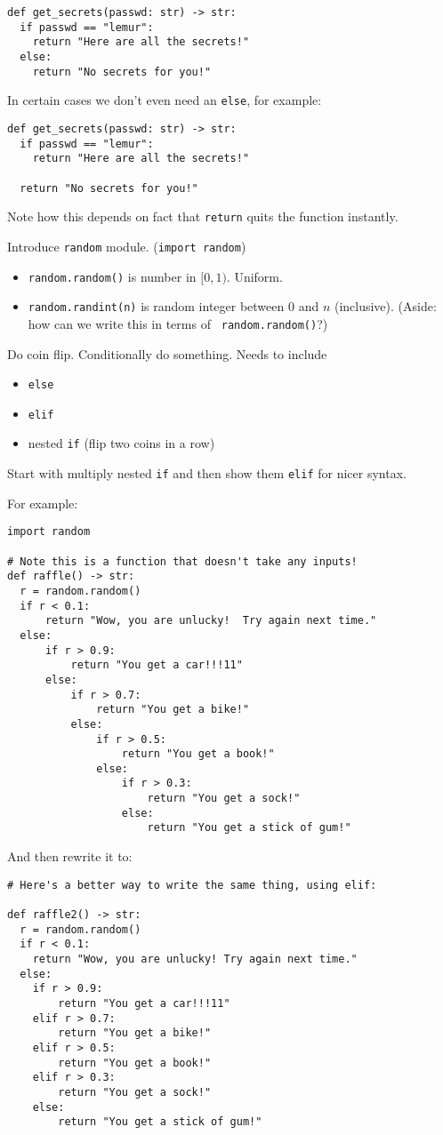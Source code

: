 \documentclass{article}
\begin{document}
\begin{verbatim}
def get_secrets(passwd: str) -> str:
  if passwd == "lemur":
    return "Here are all the secrets!"
  else:
    return "No secrets for you!"
\end{verbatim}

In certain cases we don't even need an \verb|else|, for example:
\begin{verbatim}
def get_secrets(passwd: str) -> str:
  if passwd == "lemur":
    return "Here are all the secrets!"

  return "No secrets for you!"
\end{verbatim}
Note how this depends on fact that \verb|return| quits the function
instantly.

Introduce \verb|random| module. ({\tt import random})
\begin{itemize}
\item {\tt random.random()} is number in $[0,1)$. Uniform.
\item {\tt random.randint(n)} is random integer between $0$ and $n$
  (inclusive).  (Aside: how can we write this in terms of {\tt
    random.random()}?)
\end{itemize}
Do coin flip.  Conditionally do something.  Needs to include
\begin{itemize}
\item {\tt else}
\item {\tt elif}
\item nested {\tt if}  (flip two coins in a row)
\end{itemize}

Start with multiply nested {\tt if} and then show them {\tt elif} for
nicer syntax.

For example:
\begin{verbatim}
import random

# Note this is a function that doesn't take any inputs!
def raffle() -> str:
  r = random.random()
  if r < 0.1:
      return "Wow, you are unlucky!  Try again next time."
  else:
      if r > 0.9:
          return "You get a car!!!11"
      else:
          if r > 0.7:
              return "You get a bike!"
          else:
              if r > 0.5:
                  return "You get a book!"
              else:
                  if r > 0.3:
                      return "You get a sock!"
                  else:
                      return "You get a stick of gum!"
\end{verbatim}

And then rewrite it to:
\begin{verbatim}
# Here's a better way to write the same thing, using elif:

def raffle2() -> str:
  r = random.random()
  if r < 0.1:
    return "Wow, you are unlucky! Try again next time."
  else:
    if r > 0.9:
        return "You get a car!!!11"
    elif r > 0.7:
        return "You get a bike!"
    elif r > 0.5:
        return "You get a book!"
    elif r > 0.3:
        return "You get a sock!"
    else:
        return "You get a stick of gum!"
\end{verbatim}
\end{document}
